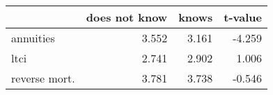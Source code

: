 \begin{tabular}{lrrr}
\toprule
{} &  does not know &  knows &  t-value \\
\midrule
annuities     &          3.552 &  3.161 &   -4.259 \\
ltci          &          2.741 &  2.902 &    1.006 \\
reverse mort. &          3.781 &  3.738 &   -0.546 \\
\bottomrule
\end{tabular}
